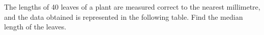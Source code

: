 \begin{flushleft}
The lengths of 40 leaves of a plant are measured correct to the nearest millimetre, and
the data obtained is represented in the following table. Find the median length of the leaves.
\end{flushleft}

\begin{table}[ht!]
\centering

\end{table} 

\begin{table}[ht!]
\centering

\end{table} 



